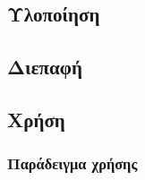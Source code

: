 \subsection{Υλοποίηση}

\subsection{Διεπαφή}

\subsection{Χρήση}

\subsubsection{Παράδειγμα χρήσης}














